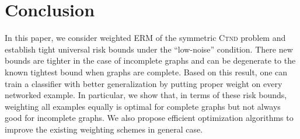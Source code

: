 \documentclass[letterpaper]{article} %
\newcommand{\probdistri}{\mathbf{p}}
\newcommand{\problemabbr}{\textnormal{C}\textsc{tnd}}
\newcommand{\normo}[1]{\|#1\|_1}
\begin{document}


\section{Conclusion} %
\label{sec:conclusion}
In this paper, we consider weighted ERM of the symmetric \problemabbr{} problem and establish tight universal risk bounds under the ``low-noise'' condition. 
There new bounds are tighter in the case of incomplete graphs and can be degenerate to the known tightest  bound when graphs are complete. 
Based on this result, one can train a classifier with better generalization by putting proper weight on every networked example. 
In particular, we show that, in terms of these risk bounds, weighting all examples equally is optimal for complete graphs but not always good for incomplete graphs. 
We also propose efficient optimization algorithms to improve the existing weighting schemes in general case. 








\end{document}
